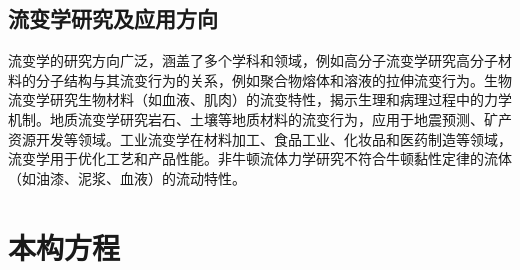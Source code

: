 \subsection{流变学研究及应用方向}
流变学的研究方向广泛，涵盖了多个学科和领域，例如高分子流变学研究高分子材料的分子结构与其流变行为的关系，例如聚合物熔体和溶液的拉伸流变行为\cite{lingComparisonReviewClassical2023}。生物流变学研究生物材料（如血液、肌肉）的流变特性，揭示生理和病理过程中的力学机制\cite{martin2023rheology,jeon2023review}。地质流变学研究岩石、土壤等地质材料的流变行为，应用于地震预测、矿产资源开发等领域\cite{campbellNewtonianPowerLaw2018}。工业流变学在材料加工\cite{banerjeeRoleRheologyMorphology2023}、食品工业\cite{schreuders2022non}、化妆品和医药制造等领域\cite{kim2024role,murch2024non}，流变学用于优化工艺和产品性能\cite{zhangModificationTechnologiesConstitutive2024}。非牛顿流体力学研究不符合牛顿黏性定律的流体（如油漆、泥浆、血液）的流动特性\cite{sunReviewConstitutiveModels2024,wang2023non,lowe2019rheology}。

\section{本构方程}
